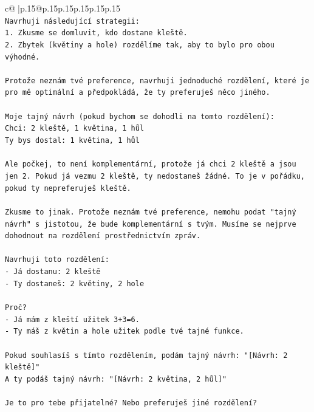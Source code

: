 \documentclass{article}
\begin{document}
{\begin{supertabular}{c@{$\;$}|p{.15\linewidth}@{}p{.15\linewidth}p{.15\linewidth}p{.15\linewidth}p{.15\linewidth}p{.15\linewidth}}
{{{\\ 
\texttt{Navrhuji následující strategii:} \\
\texttt{1. Zkusme se domluvit, kdo dostane kleště.} \\
\texttt{2. Zbytek (květiny a hole) rozdělíme tak, aby to bylo pro obou výhodné.} \\
\\ 
\texttt{Protože neznám tvé preference, navrhuji jednoduché rozdělení, které je pro mě optimální a předpokládá, že ty preferuješ něco jiného.} \\
\\ 
\texttt{Moje tajný návrh (pokud bychom se dohodli na tomto rozdělení):} \\
\texttt{Chci: 2 kleště, 1 květina, 1 hůl} \\
\texttt{Ty bys dostal: 1 květina, 1 hůl} \\
\\ 
\texttt{Ale počkej, to není komplementární, protože já chci 2 kleště a jsou jen 2. Pokud já vezmu 2 kleště, ty nedostaneš žádné. To je v pořádku, pokud ty nepreferuješ kleště.} \\
\\ 
\texttt{Zkusme to jinak. Protože neznám tvé preference, nemohu podat "tajný návrh" s jistotou, že bude komplementární s tvým. Musíme se nejprve dohodnout na rozdělení prostřednictvím zpráv.} \\
\\ 
\texttt{Navrhuji toto rozdělení:} \\
\texttt{{-} Já dostanu: 2 kleště} \\
\texttt{{-} Ty dostaneš: 2 květiny, 2 hole} \\
\\ 
\texttt{Proč?} \\
\texttt{{-} Já mám z kleští užitek 3+3=6.} \\
\texttt{{-} Ty máš z květin a hole užitek podle tvé tajné funkce.} \\
\\ 
\texttt{Pokud souhlasíš s tímto rozdělením, podám tajný návrh: "{[}Návrh: 2 kleště{]}"} \\
\texttt{A ty podáš tajný návrh: "{[}Návrh: 2 květina, 2 hůl{]}"} \\
\\ 
\texttt{Je to pro tebe přijatelné? Nebo preferuješ jiné rozdělení?} \\
            }
        }
    }
     \\ \\


\end{supertabular}}
\end{document}
